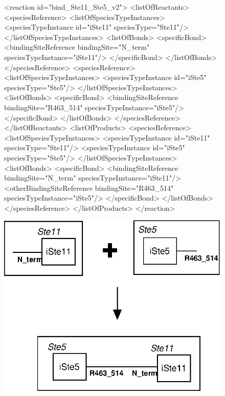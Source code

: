 \documentclass{cekarticle}
\begin{document}
\begin{figure}[h]
\begin{example}
<reaction id="bind_Ste11_Ste5_v2">
    <listOfReactants>
        <speciesReference>
            <listOfSpeciesTypeInstances>
                <speciesTypeInstance id="iSte11" speciesType="Ste11"/>
            </listOfSpeciesTypeInstances>
            <listOfBonds>
                <specificBond>
                    <bindingSiteReference bindingSite="N_term" speciesTypeInstance="iSte11"/>
                </specificBond>
            </listOfBonds>
        </speciesReference>
        <speciesReference>
            <listOfSpeciesTypeInstances>
                <speciesTypeInstance id="iSte5" speciesType="Ste5"/>
            </listOfSpeciesTypeInstances>
            <listOfBonds>
                <specificBond>
                    <bindingSiteReference bindingSite="R463_514" speciesTypeInstance="iSte5"/>
                </specificBond>
            </listOfBonds>
        </speciesReference>
    </listOfReactants>
    <listOfProducts>
        <speciesReference>
            <listOfSpeciesTypeInstances>
                <speciesTypeInstance id="iSte11" speciesType="Ste11"/>
                <speciesTypeInstance id="iSte5" speciesType="Ste5"/>
            </listOfSpeciesTypeInstances>
            <listOfBonds>
                <specificBond>
                    <bindingSiteReference bindingSite="N_term" speciesTypeInstance="iSte11"/>
                    <otherBindingSiteReference
                        bindingSite="R463_514" speciesTypeInstance="iSte5"/>
                </specificBond>
            </listOfBonds>
        </speciesReference>
    </listOfProducts>
</reaction>
\end{example}
  \vspace*{8pt}
  \centering
  \includegraphics[scale = 0.7]{bind_Ste11_Ste5_v2.eps}


\end{figure}
\end{document}
